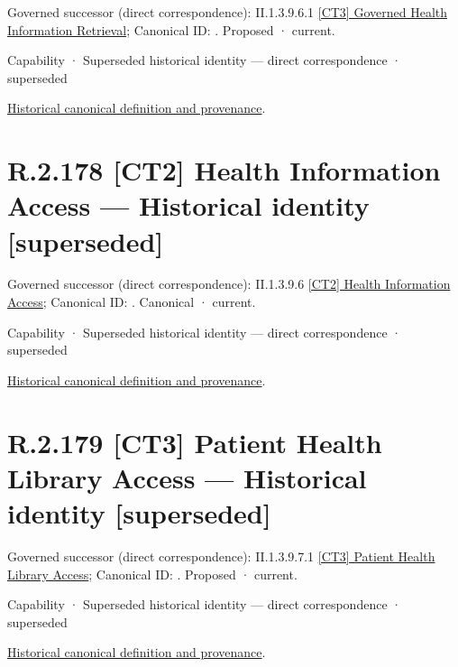 {\small Governed successor (direct correspondence): II.1.3.9.6.1 \hyperref[element:76e74e46ca4d44a1a7bb116b358f231c]{[CT3] Governed Health Information Retrieval}; Canonical ID: \texttt{}. Proposed · current.}\par
\label{element:90b838d703dd472b8b6d74961f3a748c}
{\small Capability · Superseded historical identity — direct correspondence · superseded}\par
\href{../../../../continuum/strategy/capability/90b838d703dd472b8b6d74961f3a748c.md}{Historical canonical definition and provenance}.\par
\section*{R.2.178 [CT2] Health Information Access — Historical identity [superseded]}
\label{navigation:R.2.178}

{\small Governed successor (direct correspondence): II.1.3.9.6 \hyperref[element:cc253aea3c5f489da0502df74dde1669]{[CT2] Health Information Access}; Canonical ID: \texttt{}. Canonical · current.}\par
\label{element:5019ae9f2cdc45a1b2de97bc0f5a313d}
{\small Capability · Superseded historical identity — direct correspondence · superseded}\par
\href{../../../../continuum/strategy/capability/5019ae9f2cdc45a1b2de97bc0f5a313d.md}{Historical canonical definition and provenance}.\par
\section*{R.2.179 [CT3] Patient Health Library Access — Historical identity [superseded]}
\label{navigation:R.2.179}

{\small Governed successor (direct correspondence): II.1.3.9.7.1 \hyperref[element:808e5a3c3f6b496fa329962088f0bee0]{[CT3] Patient Health Library Access}; Canonical ID: \texttt{}. Proposed · current.}\par
\label{element:b132224cfa6f435f8f2a66a3878d6df6}
{\small Capability · Superseded historical identity — direct correspondence · superseded}\par
\href{../../../../continuum/strategy/capability/b132224cfa6f435f8f2a66a3878d6df6.md}{Historical canonical definition and provenance}.\par
